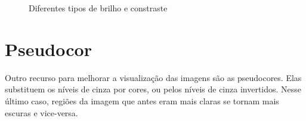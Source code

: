 \begin{figure}
  \centering
   \qquad          
  \caption{Diferentes tipos de brilho e constraste}
  \label{fig:two_window_level}
\end{figure}


\section{Pseudocor}

Outro recurso para melhorar a visualização das imagens são as pseudocores. Elas substituem os níveis
de cinza por cores, ou pelos níveis de cinza invertidos. Nesse último caso, regiões da imagem que
antes eram mais claras se tornam mais escuras e vice-versa.


